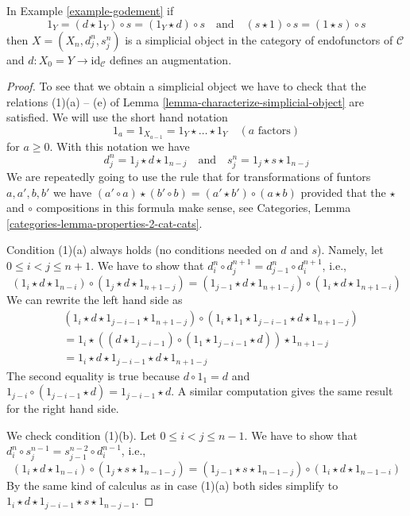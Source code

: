 \begin{lemma}
\label{lemma-godement}
In Example \ref{example-godement} if
$$
1_Y = (d \star 1_Y) \circ s = (1_Y \star d) \circ s
\quad\text{and}\quad
(s \star 1) \circ s = (1 \star s) \circ s
$$
then $X = (X_n, d^n_j, s^n_j)$ is a simplicial object in the category
of endofunctors of $\mathcal{C}$ and $d : X_0 = Y \to \text{id}_\mathcal{C}$
defines an augmentation.
\end{lemma}

\begin{proof}
To see that we obtain a simplicial object we have to check that the
relations (1)(a) -- (e) of Lemma \ref{lemma-characterize-simplicial-object}
are satisfied. We will use the short hand notation
$$
1_a = 1_{X_{a - 1}} = 1_Y \star \ldots \star 1_Y \quad (a\text{ factors})
$$
for $a \geq 0$. With this notation we have
$$
d^n_j = 1_j \star d \star 1_{n - j}
\quad\text{and}\quad
s^n_j = 1_j \star s \star 1_{n - j}
$$
We are repeatedly going to use the rule that for transformations
of funtors $a, a', b, b'$ we have
$(a' \circ a) \star (b' \circ b) = (a' \star b') \circ (a \star b)$
provided that the $\star$ and $\circ$ compositions in this formula
make sense, see
Categories, Lemma \ref{categories-lemma-properties-2-cat-cats}.

\medskip\noindent
Condition (1)(a) always holds (no conditions needed on $d$ and $s$).
Namely, let $0 \leq i < j \leq n + 1$. We have to show that
$d^n_i \circ d^{n + 1}_j = d^n_{j - 1} \circ d^{n + 1}_i$, i.e.,
$$
(1_i \star d \star 1_{n - i}) \circ
(1_j \star d \star 1_{n + 1 - j}) =
(1_{j - 1} \star d \star 1_{n + 1 - j}) \circ
(1_i \star d \star 1_{n + 1 - i})
$$
We can rewrite the left hand side as
\begin{align*}
& (1_i \star d \star 1_{j - i - 1} \star 1_{n + 1 - j}) \circ
(1_i \star 1_1 \star 1_{j - i - 1} \star d \star 1_{n + 1 - j}) \\
& =
1_i \star
\left((d \star 1_{j - i - 1}) \circ
(1_1 \star 1_{j - i - 1} \star d)\right) \star 1_{n + 1 - j} \\
& =
1_i \star d \star 1_{j - i - 1} \star d \star 1_{n + 1 - j} 
\end{align*}
The second equality is true because $d \circ 1_1 = d$ and
$1_{j - i} \circ (1_{j - i - 1} \star d) = 1_{j - i - 1} \star d$.
A similar computation gives the same result for the right hand side.

\medskip\noindent
We check condition (1)(b). Let $0 \leq i < j \leq n - 1$. We have to show
that $d^n_i \circ s^{n - 1}_j = s^{n - 2}_{j - 1} \circ d^{n - 1}_i$, i.e.,
$$
(1_i \star d \star 1_{n - i}) \circ
(1_j \star s \star 1_{n - 1 - j}) =
(1_{j - 1} \star s \star 1_{n - 1 - j}) \circ
(1_i \star d \star 1_{n - 1 - i})
$$
By the same kind of calculus as in case (1)(a) both sides simplify
to $1_i \star d \star 1_{j - i - 1} \star s \star 1_{n - j - 1}$.


\end{proof}
